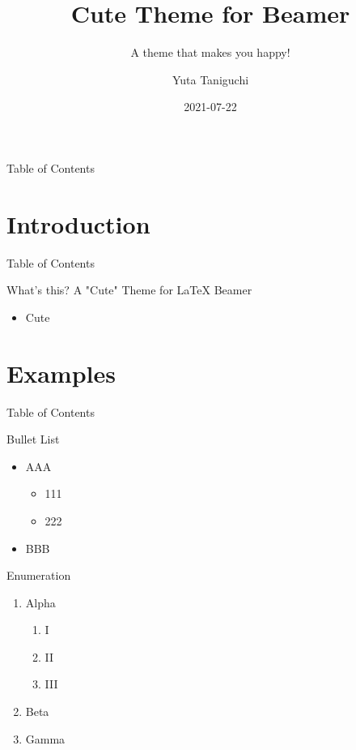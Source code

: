 \documentclass[12pt,t,hyperref={pdfencoding=auto}]{beamer}
\title[Cute Theme]{Cute Theme for Beamer}
\subtitle{A theme that makes you happy!}
\author[Y.~Taniguchi]{Yuta Taniguchi}
\institute{@yuttieyuttie}
\date{2021-07-22}
\begin{document}
{
  \frame{\titlepage}
}
\setcounter{framenumber}{0}


\begin{frame}{Table of Contents}
  \toc
\end{frame}


\section{Introduction}
\begin{frame}{Table of Contents}
  \toc[currentsection]
\end{frame}


\begin{frame}{What's this?}
  \alert{A "Cute" Theme for LaTeX Beamer}
  \begin{itemize}
    \item Cute
  \end{itemize}
\end{frame}


\section{Examples}
\begin{frame}{Table of Contents}
  \toc[currentsection]
\end{frame}


\begin{frame}{Bullet List}
  \begin{itemize}
  \item AAA
    \begin{itemize}
    \item 111
    \item 222
    \end{itemize}
  \item BBB
  \end{itemize}
\end{frame}


\begin{frame}{Enumeration}
  \begin{enumerate}
  \item Alpha
    \begin{enumerate}
    \item I
    \item II
    \item III
    \end{enumerate}
  \item Beta
  \item Gamma
  \end{enumerate}
\end{frame}
\end{document}
